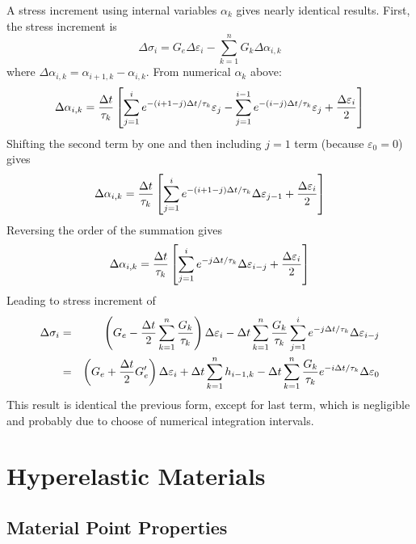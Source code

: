 \documentclass[11pt]{article}
\def\e#1{\varepsilon_{#1}}
\begin{document}
A stress increment using internal variables $\alpha_k$ gives nearly identical results. First, the stress increment is
\begin{equation}
    \Delta\sigma_i = G_e\Delta\e{i} - \sum_{k=1}^n G_k \Delta\alpha_{i,k}
\end{equation}
where $\Delta\alpha_{i,k} = \alpha_{i+1,k}-\alpha_{i,k}$. From numerical $\alpha_k$ above:
\begin{equation}
     \Delta\alpha_{i,k} = {\Delta t\over \tau_k}\left[ \sum_{j=1}^{i} e^{-(i+1-j)\Delta t/\tau_k} \e{j}  - \sum_{j=1}^{i-1} e^{-(i-j)\Delta t/\tau_k} \e{j}  
             + {\Delta\e{i}\over 2}\right]
\end{equation}
Shifting the second term by one and then including $j=1$ term (because $\e{0}=0$) gives
\begin{equation}
     \Delta\alpha_{i,k} = {\Delta t\over \tau_k}\left[ \sum_{j=1}^{i} e^{-(i+1-j)\Delta t/\tau_k} \Delta\e{j-1}    
             + {\Delta\e{i}\over 2}\right]
\end{equation}
Reversing the order of the summation gives
\begin{equation}
     \Delta\alpha_{i,k} = {\Delta t\over \tau_k}\left[ \sum_{j=1}^{i} e^{-j\Delta t/\tau_k} \Delta\e{i-j}    
             + {\Delta\e{i}\over 2}\right]
\end{equation}
Leading to stress increment of
\begin{eqnarray}
    \Delta\sigma_i & = & \left(G_e - {\Delta t\over 2}\sum_{k=1}^n  {G_k\over \tau_k}\right)\Delta\e{i} - \Delta t\sum_{k=1}^n  {G_k\over \tau_k} \sum_{j=1}^{i} e^{-j\Delta t/\tau_k} \Delta\e{i-j}  \\     
     & = & \left(G_e + {\Delta t\over 2}G_e'\right)\Delta\e{i} + \Delta t\sum_{k=1}^n h_{i-1,k} - \Delta t\sum_{k=1}^n {G_k\over \tau_k}  e^{-i\Delta t/\tau_k} \Delta\e{0}    
\end{eqnarray}
This result is identical the previous form, except for last term, which is negligible and probably due to choose of numerical integration intervals.

\section{Hyperelastic Materials}

\subsection{Material Point Properties}
\end{document}
